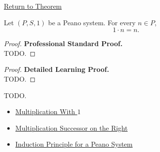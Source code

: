 \newpage
{}
\label{prf:one-times-n}

\begin{remark*}[Return]
\hyperref[thm:one-times-n]{Return to Theorem}
\end{remark*}

\begin{theorem*}
Let $(P,S,1)$ be a Peano system. For every $n \in P$,
\[
1 \cdot n = n.
\]
\end{theorem*}

\begin{proof}
\textbf{Professional Standard Proof.}~\\
TODO.
\end{proof}

\begin{proof}
\textbf{Detailed Learning Proof.}~\\
TODO.
\end{proof}

\begin{remark*}
TODO.
\end{remark*}

\begin{dependencies}
\begin{itemize}
  \item \hyperref[thm:multiplication-with-one]{Multiplication With $1$}
  \item \hyperref[thm:multiplication-successor-on-right]{Multiplication Successor on the Right}
  \item \hyperref[thm:induction-principle-for-peano-system]{Induction Principle for a Peano System}
\end{itemize}
\end{dependencies}
